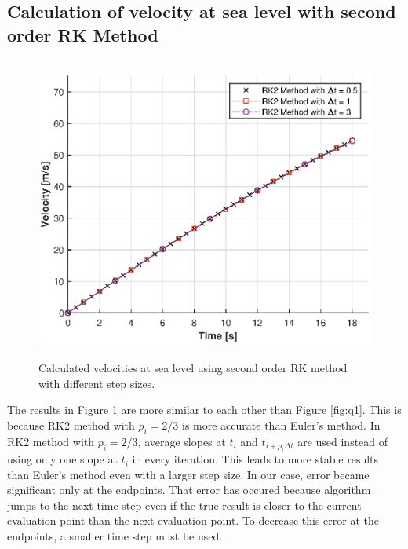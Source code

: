 \documentclass[letterpaper,12pt]{article}
\begin{document}
\subsection{Calculation of velocity at sea level with second order RK Method }
\begin{figure}[ht]
        \centering \includegraphics[max height=10cm]{graphs/RK2.eps}
        \caption{Calculated velocities at sea level using second order RK method with different step sizes.}
        \label{fig:rk2}
\end{figure}
The results in Figure \ref{fig:rk2} are more similar to each other than Figure \ref{fig:q1}. This is because RK2 method with $p_i=2/3$
is more accurate than Euler's method. In RK2 method with $p_i=2/3$, average slopes at $t_i$ and $t_{i+p_i\Delta t}$
are used instead of using only one slope at $ t_i $ in every iteration. This leads to more stable results than Euler's method 
even with a larger step size. In our case, error became significant only at the endpoints. That error has occured because
algorithm jumps to the next time step even if the true result is closer to the current evaluation point than the next evaluation point.
To decrease this error at the endpoints, a smaller time step must be used.
\newpage
\end{document}
